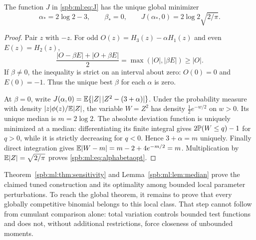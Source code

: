 \begin{lemma}\label{spb:ml:lem:median}
The function $J$ in \eqref{spb:ml:eq:J} has the unique global minimizer
\begin{equation}\label{spb:ml:eq:alphabetaopt}
 \alpha_*=2\log2-3,\qquad \beta_*=0,
 \qquad J(\alpha_*,0)=2\log2\sqrt{2/\pi}.
\end{equation}
\end{lemma}
\begin{proof}
Pair $z$ with $-z$. For odd $O(z)=H_3(z)-\alpha H_1(z)$ and even $E(z)=H_2(z)$,
\[
 \frac{|O-\beta E|+|O+\beta E|}{2}
       =\max(|O|,|\beta E|)\ge|O|.
\]
If $\beta\ne0$, the inequality is strict on an interval about zero: $O(0)=0$ and $E(0)=-1$. Thus the unique best $\beta$ for each $\alpha$ is zero.

At $\beta=0$, write
$J(\alpha,0)=\mathbb E\{|Z|\,|Z^2-(3+\alpha)|\}$. Under the probability measure with density $|z|\phi(z)/\mathbb E|Z|$, the variable $W=Z^2$ has density $\frac12e^{-w/2}$ on $w>0$. Its unique median is $m=2\log2$. The absolute deviation function is uniquely minimized at a median: differentiating its finite integral gives $2\mathbb P(W\le q)-1$ for $q>0$, while it is strictly decreasing for $q<0$. Hence $3+\alpha=m$ uniquely. Finally direct integration gives $\mathbb E|W-m|=m-2+4e^{-m/2}=m$. Multiplication by $\mathbb E|Z|=\sqrt{2/\pi}$ proves \eqref{spb:ml:eq:alphabetaopt}.
\end{proof}

Theorem~\ref{spb:ml:thm:sensitivity} and Lemma~\ref{spb:ml:lem:median} prove the claimed tuned construction and its optimality among bounded local parameter perturbations. To reach the global theorem, it remains to prove that every globally competitive binomial belongs to this local class. That step cannot follow from cumulant comparison alone: total variation controls bounded test functions and does not, without additional restrictions, force closeness of unbounded moments.
